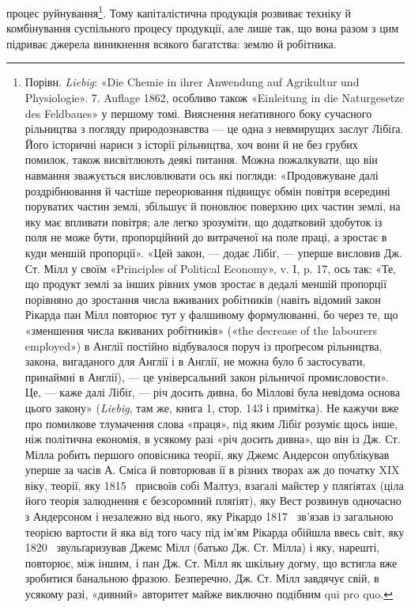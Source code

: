 процес руйнування\footnote{
Порівн. \emph{Liebig}: «Die Chemie in ihrer Anwendung auf Agrikultur
und Physiologie». 7. Auflage 1862, особливо також «Einleitung
in die Naturgesetze des Feldbaues» у першому томі. Вияснення неґативного
боку сучасного рільництва з погляду природознавства — це одна
з невмирущих заслуг Лібіґа. Його історичні нариси з історії рільництва,
хоч вони й не без грубих помилок, також висвітлюють деякі питання.
Можна пожалкувати, що він навмання зважується висловлювати
ось які погляди: «Продовжуване далі роздрібнювання й частіше переорювання
підвищує обмін повітря всередині поруватих частин землі, збільшує
й поновлює поверхню цих частин землі, на яку має впливати повітря;
але легко зрозуміти, що додатковий здобуток із поля не може бути,
пропорційний до витраченої на поле праці, а зростає в куди меншій пропорції».
«Цей закон, — додає Лібіґ, — уперше висловив Дж. Ст. Мілл у своїм
«Principles of Political Economy», v. I, p. 17, ось так: «Те, що продукт
землі за інших рівних умов зростає в дедалі меншій пропорції порівняно
до зростання числа вживаних робітників (навіть відомий закон Рікарда
пан Мілл повторює тут у фалшивому формулюванні, бо через те, що «зменшення
числа вживаних робітників» («the decrease of the labourers employed»)
в Англії постійно відбувалося поруч із проґресом рільництва, закона,
вигаданого для Англії і в Англії, не можна було б застосувати, принаймні
в Англії), — це універсальний закон рільничої промисловости». Це, — каже
далі Лібіґ, — річ досить дивна, бо Міллові була невідома основа цього закону»
(\emph{Liebig}, там же, книга 1, стор. 143 і примітка). Не кажучи вже про
помилкове тлумачення слова «праця», під яким Лібіґ розуміє щось інше,
ніж політична економія, в усякому разі «річ досить дивна», що він із Дж.
Ст. Мілла робить першого оповісника теорії, яку Джемс Андерсон опублікував
уперше за часів А. Сміса й повторював її в різних творах аж до
початку XIX віку, теорії, яку 1815~ присвоїв собі Малтуз, взагалі
майстер у пляґіятах (ціла його теорія залюднення є безсоромний пляґіят),
яку Вест розвинув одночасно з Андерсоном і незалежно від нього,
яку Рікардо 1817~ зв’язав із загальною теорією вартости й яка від
того часу під ім’ям Рікарда обійшла ввесь світ, яку 1820~ звульґаризував
Джемс Мілл (батько Дж. Ст. Мілла) і яку, нарешті, повторює, між
іншим, і пан Дж. Ст. Мілл як шкільну догму, що встигла вже зробитися
банальною фразою. Безперечно, Дж. Ст. Мілл завдячує свій, в усякому
разі, «дивний» авторитет майже виключно подібним qui pro quo.
}. Тому капіталістична продукція розвиває
техніку й комбінування суспільного процесу продукції, але
лише так, що вона разом з цим підриває джерела виникнення
всякого багатства: землю й робітника.

